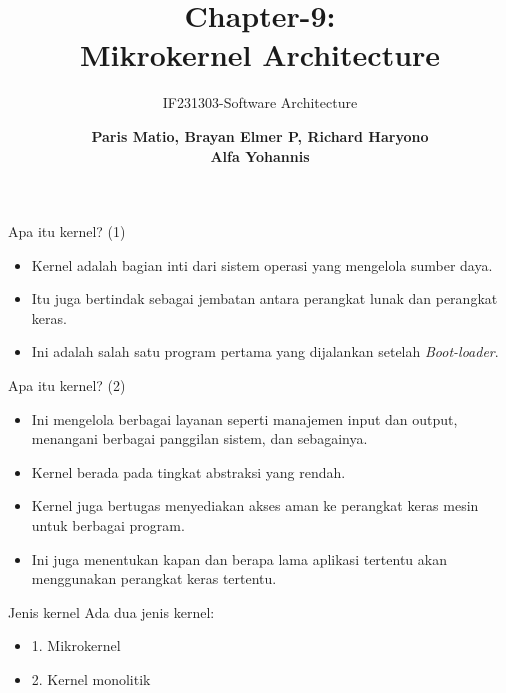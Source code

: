 \documentclass[aspectratio=169, table]{beamer}
\subtitle{IF231303-Software Architecture}
\title{\huge Chapter-9:\\Mikrokernel Architecture}
\author[Pradita]{\small {\textbf{Paris Matio, Brayan Elmer P, Richard Haryono\\ Alfa Yohannis}}}
\begin{document}
    \begin{frame}[plain]
        \maketitle
    \end{frame}

    \begin{frame}{Apa itu kernel? (1)}
        \begin{itemize}
            \item Kernel adalah bagian inti dari sistem operasi yang mengelola sumber daya.
            \item Itu juga bertindak sebagai jembatan antara perangkat lunak dan perangkat keras.
            \item Ini adalah salah satu program pertama yang dijalankan setelah \textit{Boot-loader}.
        \end{itemize}
    \end{frame}


    \begin{frame}{Apa itu kernel? (2)}
        \begin{itemize}
            \item Ini mengelola berbagai layanan seperti manajemen input dan output, menangani berbagai panggilan sistem, dan sebagainya.
            \item Kernel berada pada tingkat abstraksi yang rendah.
            \item Kernel juga bertugas menyediakan akses aman ke perangkat keras mesin untuk   berbagai program.
            \item Ini juga menentukan kapan dan berapa lama aplikasi tertentu akan menggunakan perangkat keras tertentu.
        \end{itemize}
    \end{frame}

    \begin{frame}{Jenis kernel}
        Ada dua jenis kernel:
        \begin{itemize}
            \item 	1. Mikrokernel
            \item	2. Kernel monolitik
        \end{itemize}

    \end{frame}
\end{document}

